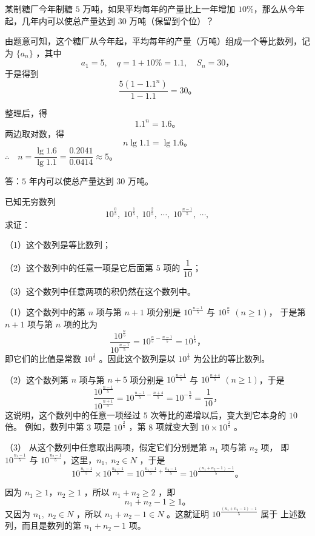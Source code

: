 \liti 某制糖厂今年制糖 $5$ 万吨，如果平均每年的产量比上一年增加 $10\%$，那么从今年起，几年内可以使总产量达到 $30$ 万吨（保留到个位）？

\jie 由题意可知，这个糖厂从今年起，平均每年的产量（万吨）组成一个等比数列，记为 $\{a_n\}$ ，其中
$$ a_1 = 5, \quad q = 1 + 10\%  = 1.1, \quad S_n = 30 \text{，} $$
于是得到
$$ \dfrac{5(1 - 1.1^n)}{1 - 1.1} = 30 \text{。} $$

整理后，得
$$ 1.1^n = 1.6 \text{。} $$
两边取对数，得
$$ n\lg 1.1 = \lg 1.6 \text{。} $$
$\therefore \quad n = \dfrac{\lg 1.6}{\lg 1.1} = \dfrac{0.2041}{0.0414} \approx 5 \text{。}$

答：$5$ 年内可以使总产量达到 $30$ 万吨。


\liti 已知无穷数列
$$ 10^\frac{0}{5},\; 10^\frac{1}{5},\; 10^\frac{2}{5},\; \cdots,\; 10^\frac{n-1}{5},\; \cdots, $$
求证：

（1）这个数列是等比数列；

（2）这个数列中的任意一项是它后面第 $5$ 项的 $\dfrac{1}{10}$；

（3）这个数列中任意两项的积仍然在这个数列中。

\zhengming （1）这个数列中的第 $n$ 项与第 $n + 1$ 项分别是 $10^\frac{n-1}{5}$ 与 $10^\frac{n}{5}$ $(n \geqslant 1)$，
于是第 $n + 1$ 项与第 $n$ 项的比为
$$ \dfrac{10^\frac{n}{5}}{10^\frac{n-1}{5}} = 10^{\frac{n}{5} - \frac{n-1}{5}} = 10^\frac{1}{5} \text{，}$$
即它们的比值是常数 $10^\frac{1}{5}$ 。因此这个数列是以 $10^\frac{1}{5}$ 为公比的等比数列。

（2）这个数列第 $n$ 项与第 $n + 5$ 项分别是 $10^\frac{n-1}{5}$ 与 $10^\frac{n+4}{5}$ $(n \geqslant 1)$，于是
$$ \dfrac{10^\frac{n-1}{5}}{10^\frac{n+1}{5}} = 10^{\frac{n-1}{5} - \frac{n+4}{5}} = 10^{-\frac{5}{5}} = \dfrac{1}{10} \text{，}$$
这说明，这个数列中的任意一项经过 $5$ 次等比的递增以后，变大到它本身的 $10$ 倍。
例如，数列中第 $3$ 项是 $10^\frac{2}{5}$ ，第 $8$ 项就变大到 $10 \times 10^\frac{2}{5}$ 。

（3） 从这个数列中任意取出两项，假定它们分别是第 $n_1$ 项与第 $n_2$ 项， 即 $10^\frac{n_1 - 1}{5}$ 与 $10^\frac{n_2 - 1}{5}$，这里，$n_1,\; n_2 \in N$ ，于是
$$ 10^\frac{n_1 - 1}{5} \times 10^\frac{n_2 - 1}{5} = 10^{\frac{n_1 - 1}{5} + \frac{n_2 - 1}{5}} = 10^\frac{(n_1 + n_2 -1) - 1}{5} \text{。}$$

因为 $n_1 \geqslant 1$，$n_2 \geqslant 1$ ，所以 $n_1 + n_2 \geqslant 2$ ，即
$$ n_1 + n_2 - 1 \geqslant 1 \text{。}$$
又因为 $n_1,\; n_2 \in N$ ，所以 $n_1 + n_2 - 1 \in N$ 。这就证明 $10^\frac{(n_1 + n_2 -1) - 1}{5}$ 属于
上述数列，而且是数列的第 $n_1 + n_2 - 1$ 项。


